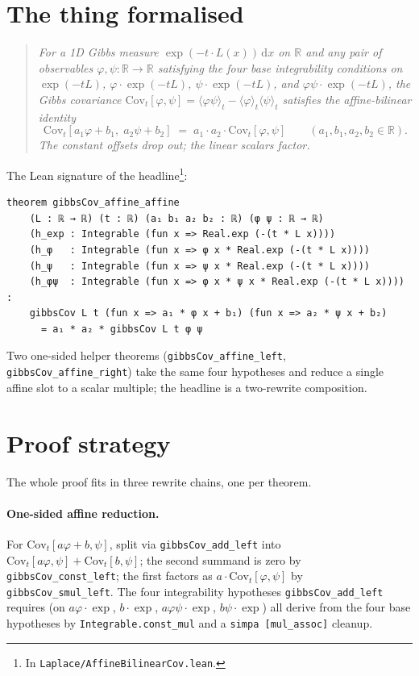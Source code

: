 \documentclass[11pt]{article}
\begin{document}
\section{The thing formalised}

\begin{quote}\itshape
For a 1D Gibbs measure $\exp(-t \cdot L(x))\,\mathrm{d}x$ on $\mathbb{R}$
and any pair of observables $\varphi, \psi : \mathbb{R} \to \mathbb{R}$
satisfying the four base integrability conditions on $\exp(-tL)$,
$\varphi\cdot\exp(-tL)$, $\psi\cdot\exp(-tL)$, and
$\varphi\psi\cdot\exp(-tL)$, the Gibbs covariance
$\mathrm{Cov}_t[\varphi, \psi]
   = \langle\varphi\psi\rangle_t - \langle\varphi\rangle_t \langle\psi\rangle_t$
satisfies the affine-bilinear identity
\[
  \mathrm{Cov}_t[a_1 \varphi + b_1,\; a_2 \psi + b_2]
  \;=\; a_1 \cdot a_2 \cdot \mathrm{Cov}_t[\varphi, \psi]
  \qquad (a_1, b_1, a_2, b_2 \in \mathbb{R}).
\]
The constant offsets drop out; the linear scalars factor.
\end{quote}

The Lean signature of the headline\footnote{In
\texttt{Laplace/AffineBilinearCov.lean}.}:

\begin{verbatim}
theorem gibbsCov_affine_affine
    (L : ℝ → ℝ) (t : ℝ) (a₁ b₁ a₂ b₂ : ℝ) (φ ψ : ℝ → ℝ)
    (h_exp : Integrable (fun x => Real.exp (-(t * L x))))
    (h_φ   : Integrable (fun x => φ x * Real.exp (-(t * L x))))
    (h_ψ   : Integrable (fun x => ψ x * Real.exp (-(t * L x))))
    (h_φψ  : Integrable (fun x => φ x * ψ x * Real.exp (-(t * L x)))) :
    gibbsCov L t (fun x => a₁ * φ x + b₁) (fun x => a₂ * ψ x + b₂)
      = a₁ * a₂ * gibbsCov L t φ ψ
\end{verbatim}

Two one-sided helper theorems
(\texttt{gibbsCov\_affine\_left}, \texttt{gibbsCov\_affine\_right}) take
the same four hypotheses and reduce a single affine slot to a scalar
multiple; the headline is a two-rewrite composition.

\section{Proof strategy}

The whole proof fits in three rewrite chains, one per theorem.

\paragraph{One-sided affine reduction.} For
$\mathrm{Cov}_t[a\varphi + b, \psi]$, split via
\texttt{gibbsCov\_add\_left} into
$\mathrm{Cov}_t[a\varphi, \psi] + \mathrm{Cov}_t[b, \psi]$;
the second summand is zero by \texttt{gibbsCov\_const\_left}; the first
factors as $a \cdot \mathrm{Cov}_t[\varphi, \psi]$ by
\texttt{gibbsCov\_smul\_left}. The four integrability hypotheses
\texttt{gibbsCov\_add\_left} requires (on $a\varphi\cdot\exp$,
$b\cdot\exp$, $a\varphi\psi\cdot\exp$, $b\psi\cdot\exp$) all derive
from the four base hypotheses by \texttt{Integrable.const\_mul} and a
\texttt{simpa [mul\_assoc]} cleanup.
\end{document}
